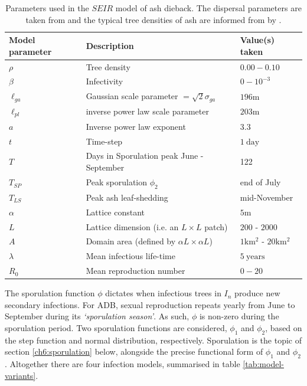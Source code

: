 \begin{table}[h]
\centering
\begin{tabular}{l l l}
\hline
\textbf{Model parameter} & \textbf{Description} & \textbf{Value(s) taken}\\
\hline
$\rho$  & Tree density & $0.00 - 0.10$ \\ 
$\beta$ & Infectivity & $0 - 10^{-3}$ \\
$\ell_{ga}$ & Gaussian scale parameter $=\sqrt{2}\sigma_{ga}$ & $196\mathrm{m}$ \\
$\ell_{pl}$ & inverse power law scale parameter & $203\mathrm{m}$ \\
$a$ & Inverse power law exponent & $3.3$ \\
$t$ & Time-step & $1\ \mathrm{day}$\\
$T$ & Days in Sporulation peak June - September & 122  \\
$T_{SP}$ & Peak sporulation $\phi_2$ & end of July \\
$T_{LS}$ & Peak ash leaf-shedding & mid-November \\
$\alpha$ & Lattice constant & $5\mathrm{m}$ \\
$L$ & Lattice dimension (i.e. an $L\times L$ patch)  & $200$ - $2000$ \\
$A$ & Domain area (defined by $\alpha L\times \alpha L$) & $1\mathrm{km^2}$ - $20\mathrm{km^2}$ \\
$\lambda$ & Mean infectious life-time & $5\ \mathrm{years}$ \\
$R_0$ & Mean reproduction number & $0-20$ \\
\hline
\end{tabular}
\caption{Parameters used in the $SEIR$ model of ash dieback. The dispersal parameters are taken from \cite{grosdidier2018tracking} and the typical tree densities of ash are informed from by \cite{hill.data}.}
\label{tab:SEIR-model}
\end{table}

The sporulation function $\phi$ dictates when infectious trees in $I_n$ produce new secondary infections. 
For ADB, sexual reproduction repeats yearly from June to September during its \textit{`sporulation season'}.
As such, $\phi$ is non-zero during the sporulation period.
Two sporulation functions are considered, $\phi_1$ and $\phi_2$, based on the step function and normal distribution, respectively.
Sporulation is the topic of section \ref{ch6:sporulation} below, alongside the precise functional form of $\phi_1$ and $\phi_2$.
Altogether there are four infection models, summarised in table \ref{tab:model-variants}.

